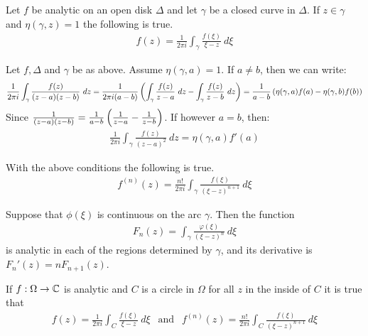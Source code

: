 \begin{theorem}
    Let $f$ be analytic on an open disk $\Delta$ and let $\gamma$ be a closed
    curve in $\Delta$. If $z \in \gamma$ and $\eta(\gamma,z) = 1$ the following
    is true.
    \begin{align*}
        f(z) = \frac{1}{2 \pi i} \int_\gamma \frac{f(\xi)}{\xi - z} \ d \xi
    \end{align*}
\end{theorem}

\begin{corollary}
    Let $f, \Delta$ and $\gamma$ be as above. Assume $\eta(\gamma,a) = 1$. If $a \neq b$,
    then we can write:
    \begin{align*}
        \frac{1}{2 \pi i}
        \int_\gamma \frac{f(z)}{(z-a)(z-b)} \ dz
        = \frac{1}{2 \pi i (a-b)} \left( \int_\gamma \frac{f(z)}{z-a} \ dz -
            \int_\gamma \frac{f(z)}{z-b} \ dz \right)
        = \frac{1}{a-b} \left( \eta(\gamma,a) f(a) - \eta(\gamma,b) f(b) \right)
    \end{align*}
    Since $\frac{1}{(z-a)(z-b)} = \frac{1}{a-b} \left( \frac{1}{z-a} - \frac{1}{z-b} \right)$.
    If however $a=b$, then:
    \begin{align*}
        \frac{1}{2 \pi i} \int_\gamma \frac{f(z)}{(z-a)^2} \ dz
        = \eta(\gamma,a) f'(a)
    \end{align*}
\end{corollary}

\begin{theorem}
    With the above conditions the following is true.
    \begin{align*}
        f^{(n)} (z) = \frac{n!}{2 \pi i} \int_\gamma \frac{f(\xi)}{(\xi -z)^{n+1}} \ d \xi
    \end{align*}
\end{theorem}

\begin{lemma}
    Suppose that $\phi(\xi)$ is continuous on the arc $\gamma$. Then the function
    \begin{align*}
        F_n (z) = \int_\gamma \frac{\varphi(\xi)}{(\xi-z)^n} \ d \xi
    \end{align*}
    is analytic in each of the regions determined by $\gamma$, and its derivative
    is $F_n'(z) = n F_{n+1} (z)$.
\end{lemma}

\begin{theorem}
    If $f: \Omega \rightarrow \mathbb{C}$ is analytic and $C$ is a circle in $\Omega$ for all
    $z$ in the inside of $C$ it is true that
    \begin{align*}
        f(z) = \frac{1}{2 \pi i} \int_C \frac{f(\xi)}{\xi - z} \ d \xi
        \ \ \text{ and } \ \
        f^{(n)} (z) = \frac{n!}{2 \pi i} \int_C \frac{f(\xi)}{(\xi - z)^{n+1}} \ d \xi
    \end{align*}
\end{theorem}

